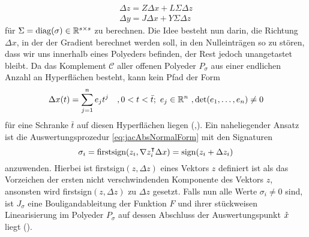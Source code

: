 \begin{equation}
\begin{aligned}
  \Delta z = Z\Delta x + L\Sigma \Delta z \\
 \Delta y = J\Delta x + Y\Sigma \Delta z  
\end{aligned}
\label{eq:jacAbsNormalForm}
\end{equation}
für $\Sigma = \operatorname{diag}(\sigma) \in \mathbb{R}^{s\times s}$ zu berechnen. Die Idee besteht nun darin, die Richtung $\Delta x$, in der der Gradient berechnet werden soll, in den Nulleinträgen so zu stören, dass wir uns innerhalb eines Polyeders befinden, der Rest jedoch unangetastet bleibt. Da das Komplement $\mathcal C$ aller offenen Polyeder $P_\sigma$ aus einer endlichen Anzahl an Hyperflächen besteht, kann kein Pfad der Form
\begin{equation}
 \Delta x(t) = \sum_{j=1}^n e_j t^j \quad ,0<t<\bar t;~e_j\in \mathbb{R}^n ~,\det(e_1,\ldots,e_n)\neq 0
\end{equation}
für eine Schranke $\bar t$ auf diesen Hyperflächen liegen (\cite[Proposition 6]{monster},\cite[S.11]{plan}). 
Ein naheliegender Ansatz ist die Auswertungsprozedur \eqref{eq:jacAbsNormalForm} mit den Signaturen
\[
 \sigma_i = \text{firstsign}(z_i,\nabla z_i^\intercal\Delta x) = \text{sign}(z_i+\Delta z_i)
\]
anzuwenden. Hierbei ist firstsign$(z,\Delta z)$ eines Vektors $z$ definiert ist als das Vorzeichen der ersten nicht verschwindenden Komponente des Vektors $z$, ansonsten wird firstsign$(z,\Delta z)$ zu $\Delta z$ gesetzt. Falls nun alle Werte $\sigma_i \neq 0$ sind, ist $J_\sigma$ eine Bouligandableitung der Funktion $F$ und ihrer stückweisen Linearisierung im Polyeder $P_\sigma$ auf dessen Abschluss der Auswertungspunkt $\mathring{x}$ liegt (\cite[S.30]{monster}).

